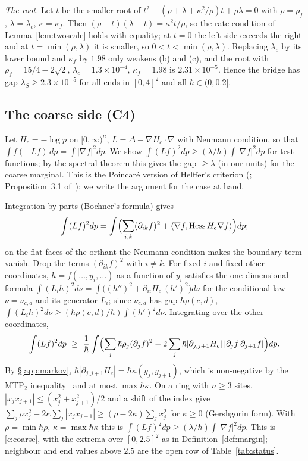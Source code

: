 \documentclass[11pt,a4paper]{article}
\theoremstyle{definition}
\theoremstyle{remark}
\newcommand{\hk}{\hbar\kappa}
\newcommand{\hr}{\hbar\rho}
\begin{document}
\emph{The root.} Let $t$ be the smaller root of $t^2-(\rho+\lambda+\kappa^2/\rho)t+\rho\lambda=0$ with $\rho=\rho_f$, $\lambda=\lambda_c$, $\kappa=\kappa_f$. Then $(\rho-t)(\lambda-t)=\kappa^2t/\rho$, so the rate condition of Lemma~\ref{lem:twoscale} holds with equality; at $t=0$ the left side exceeds the right and at $t=\min(\rho,\lambda)$ it is smaller, so $0<t<\min(\rho,\lambda)$. Replacing $\lambda_c$ by its lower bound and $\kappa_f$ by $1.98$ only weakens (b) and (c), and the root with $\rho_f=15/4-2\sqrt2$, $\lambda_c=1.3\times10^{-4}$, $\kappa_f=1.98$ is $2.31\times10^{-5}$. Hence the bridge has gap $\lambda_S\ge2.3\times10^{-5}$ for all ends in $[0,4]^2$ and all $\hbar\in(0,0.2]$.

\subsection{The coarse side (C4)}\label{app:coarse}
Let $H_c=-\log p$ on $[0,\infty)^n$, $L=\Delta-\nabla H_c\cdot\nabla$ with Neumann condition, so that $\int f(-Lf)\,dp=\int|\nabla f|^2dp$. We show $\int(Lf)^2dp\ge(\lambda/\hbar)\int|\nabla f|^2dp$ for test functions; by the spectral theorem this gives the gap $\ge\lambda$ (in our units) for the coarse marginal. This is the Poincaré version of Helffer's criterion (\cite{He}; Proposition~3.1 of~\cite{Le}); we write the argument for the case at hand.

Integration by parts (Bochner's formula) gives \[\int(Lf)^2dp=\int\Bigl(\sum_{i,k}(\partial_{ik}f)^2+\langle\nabla f,\operatorname{Hess}H_c\nabla f\rangle\Bigr)dp;\] on the flat faces of the orthant the Neumann condition makes the boundary term vanish. Drop the terms $(\partial_{ik}f)^2$ with $i\ne k$. For fixed $i$ and fixed other coordinates, $h=f(\dots,y_i,\dots)$ as a function of $y_i$ satisfies the one-dimensional formula $\int(L_ih)^2d\nu=\int\bigl((h'')^2+\partial_{ii}H_c\,(h')^2\bigr)d\nu$ for the conditional law $\nu=\nu_{c,d}$ and its generator $L_i$; since $\nu_{c,d}$ has gap $\hr(c,d)$, $\int(L_ih)^2d\nu\ge(\hr(c,d)/\hbar)\int(h')^2d\nu$. Integrating over the other coordinates,
\[
\int(Lf)^2dp\ \ge\ \frac1\hbar\int\Bigl(\sum_j\hr_j(\partial_jf)^2-2\sum_j\hbar|\partial_{j,j+1}H_c|\,|\partial_jf\,\partial_{j+1}f|\Bigr)dp .
\]
By \S\ref{app:markov}, $\hbar|\partial_{j,j+1}H_c|=\hk(y_j,y_{j+1})$, which is non-negative by the MTP$_2$ inequality~\cite{KR} and at most $\max\hk$. On a ring with $n\ge3$ sites, $|x_jx_{j+1}|\le(x_j^2+x_{j+1}^2)/2$ and a shift of the index give $\sum_j\rho x_j^2-2\kappa\sum_j|x_jx_{j+1}|\ge(\rho-2\kappa)\sum_jx_j^2$ for $\kappa\ge0$ (Gershgorin form). With $\rho=\min\hr$, $\kappa=\max\hk$ this is $\int(Lf)^2dp\ge(\lambda/\hbar)\int|\nabla f|^2dp$. This is \ref{c:coarse}, with the extrema over $[0,2.5]^2$ as in Definition~\ref{def:margin}; neighbour and end values above $2.5$ are the open row of Table~\ref{tab:status}.
\end{document}
